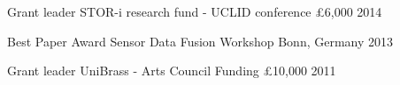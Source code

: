 \begin{cvhonors}

    \cvhonor
    {Grant leader}
    {STOR-i research fund - UCLID conference}
    {£6,000}
    {2014}
    
  \cvhonor
    {Best Paper Award}
    {Sensor Data Fusion Workshop}
    {Bonn, Germany}
    {2013}
    
     \cvhonor
    {Grant leader}
    {UniBrass - Arts Council Funding}
    {£10,000}
    {2011}
\end{cvhonors}
